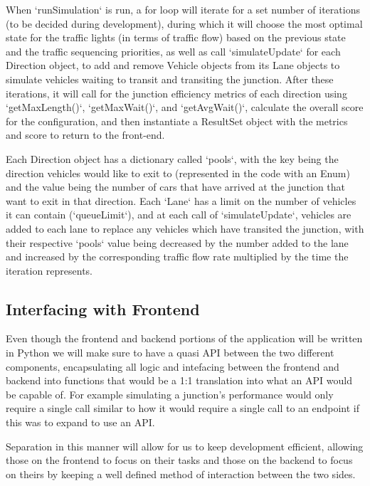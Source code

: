 \documentclass{article}
\begin{document}
When `runSimulation` is run, a for loop will iterate for a set number of iterations (to be decided during development), during 
which it will choose the most optimal state for the traffic lights (in terms of traffic flow) based on the previous state and the 
traffic sequencing priorities, as well as call `simulateUpdate` for each Direction object, to add and remove Vehicle objects from 
its Lane objects to simulate vehicles waiting to transit and transiting the junction. After these iterations, it will call for 
the junction efficiency metrics of each direction using `getMaxLength()`, `getMaxWait()`, and `getAvgWait()`, calculate the 
overall score for the configuration, and then instantiate a ResultSet object with the metrics and score to return to the front-end.

Each Direction object has a dictionary called `pools`, with the key being the direction vehicles would like to exit to (represented 
in the code with an Enum) and the value being the number of cars that have arrived at the junction that want to exit in that 
direction. Each `Lane` has a limit on the number of vehicles it can contain (`queueLimit`), and at each call of `simulateUpdate`, 
vehicles are added to each lane to replace any vehicles which have transited the junction, with their respective `pools` value 
being decreased by the number added to the lane and increased by the corresponding traffic flow rate multiplied by the time the 
iteration represents.


\subsection{Interfacing with Frontend}

Even though the frontend and backend portions of the application will be 
written in Python we will make sure to have a quasi API between the two 
different components, encapsulating all logic and intefacing between the 
frontend and backend into functions that would be a 1:1 translation into 
what an API would be capable of. For example simulating a junction's 
performance would only require a single call similar to how it would require 
a single call to an endpoint if this was to expand to use an API.

Separation in this manner will allow for us to keep development efficient, 
allowing those on the frontend to focus on their tasks and those on the 
backend to focus on theirs by keeping a well defined method of interaction 
between the two sides.
\end{document}
